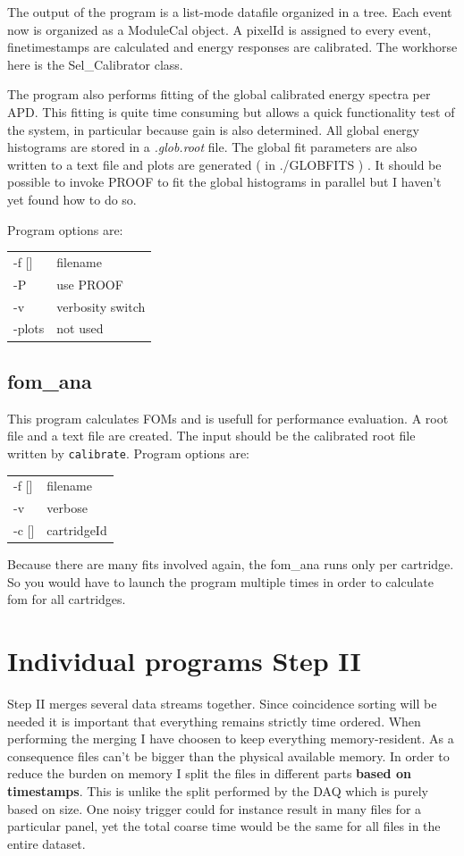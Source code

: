 \documentclass[12pt]{article}
\begin{document}
The output of the program is a list-mode datafile organized in a tree. Each event now is organized as a  ModuleCal object. A pixelId is assigned to every event, finetimestamps are calculated and energy responses are calibrated. The workhorse here is the Sel\_Calibrator class. 

The program also performs fitting of the global calibrated energy spectra per APD. This fitting is quite time consuming but allows a quick functionality test of the system, in particular because gain is also determined. All global energy histograms are stored in a {\em *.glob.root} file. The global fit parameters are also written to a text file and plots are generated ( in ./GLOBFITS ) . It should be possible to invoke PROOF to fit the global histograms in parallel but I haven't yet found how to do so. 

Program options are:\\
\begin{tabular}{ll}
-f []& filename \\
-P & use PROOF\\
-v & verbosity switch\\
-plots & not used\\
\end{tabular}

\subsection{fom\_ana}
This program calculates FOMs and is usefull for performance evaluation. A root file and a text file are created. The input should be the calibrated root file written by {\tt calibrate}. Program options are:
\begin{tabular}{ll}
-f []& filename\\
-v & verbose\\
-c []& cartridgeId\\
\end{tabular}
Because there are many fits involved again, the fom\_ana runs only per cartridge. So you would have to launch the program multiple times in order to calculate fom for all cartridges.

\section{Individual programs Step II}
Step II merges several data streams together. Since coincidence sorting will
be needed it is important that everything remains strictly time ordered. When
performing the merging I have choosen to keep everything memory-resident. As a
consequence files can't be bigger than the physical available memory. In order
to reduce the burden on memory I split the files in different parts {\bf based
  on timestamps}. This is unlike the split performed by the DAQ which is
purely based on size. One noisy trigger could for instance result in many
files for a particular panel, yet the total coarse time would be the same for
all files in the entire dataset. 
\end{document}
